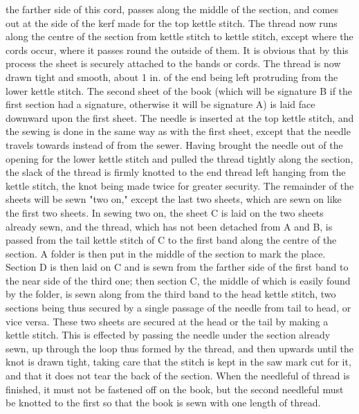 \documentclass[twoside]{book}
\begin{document}
the farther side of this cord, passes along the
middle of the section, and comes out at the side of
the kerf made for the top kettle stitch. The thread
now runs along the centre of the section from kettle
stitch to kettle stitch, except where the cords occur,
where it passes round the outside of them. It is
obvious that by this process the sheet is securely
attached to the bands or cords. The thread is now
drawn tight and smooth, about 1 in. of the end
being left protruding from the lower kettle stitch.
The second sheet of the book (which will be signature
\pagebreak
B if the first section had a signature, otherwise
it will be signature A) is laid face downward upon
the first sheet. The needle is inserted at the top
kettle stitch, and the sewing is done in the same
way as with the first sheet, except that the needle
travels towards instead of from the sewer. Having
brought the needle out of the opening for the lower
kettle stitch and pulled the thread tightly along
the section, the slack of the thread is firmly knotted
to the end thread left hanging from the kettle stitch,
the knot being made twice for greater security. The
remainder of the sheets will be sewn "two on,"
except the last two sheets, which are sewn on like
the first two sheets. In sewing two on, the sheet C
is laid on the two sheets already sewn, and the
thread, which has not been detached from A and B,
is passed from the tail kettle stitch of C to the first
band along the centre of the section. A folder is
then put in the middle of the section to mark the
place. Section D is then laid on C and is sewn
from the farther side of the first band to the near
side of the third one; then section C, the middle of
which is easily found by the folder, is sewn along
from the third band to the head kettle stitch, two
sections being thus secured by a single passage of
the needle from tail to head, or vice versa. These
two sheets are secured at the head or the tail by
making a kettle stitch. This is effected by passing
the needle under the section already sewn, up
through the loop thus formed by the thread, and
then upwards until the knot is drawn tight, taking
care that the stitch is kept in the saw mark cut for
it, and that it does not tear the back of the section.
When the needleful of thread is finished, it must
not be fastened off on the book, but the second
needleful must be knotted to the first so that the
book is sewn with one length of thread.
\end{document}
